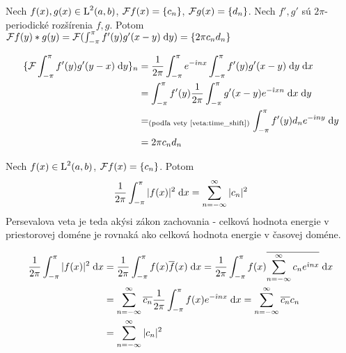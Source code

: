\begin{veta}[O konvolúcii]
Nech $f(x),g(x) \in \mbox{L}^2(a,b)$, $\mathcal{F}{f(x)} = \{c_n\}$,
$\mathcal{F}{g(x)} = \{d_n\}$. Nech $f', g'$ sú $2\pi$-periodické
rozšírenia $f,g$. Potom $\mathcal{F} f(y)*g(y) = 
    \mathcal{F} (\int_{-\pi}^{\pi} f'(y)g'(x-y) \; \mathrm{d} y) = \{ 2\pi c_n d_n \}$

\end{veta}
\begin{dokaz}
    \begin{equation*}
    \begin{split}
        \{\mathcal{F} \int_{-\pi}^{\pi} f'(y)g'(y-x) \; \mathrm{d} y\}_n 
        &= \frac{1}{2\pi} \int_{-\pi}^{\pi} e^{-\hat{\imath} n x}
            \int_{-\pi}^{\pi} f'(y)g'(x-y) \; \mathrm{d} y \; \mathrm{d} x \\
         &= \int_{-\pi}^{\pi} f'(y) \frac{1}{2\pi} \int_{-\pi}^{\pi}  g'(x-y) e^{-\hat{\imath} x n}
         \; \mathrm{d} x \; \mathrm{d} y \\
        &=_\text{(podľa vety \ref{veta:time_shift})}
          \int_{-\pi}^{\pi} f'(y) d_{n} e^{-\hat{\imath} n y} \; \mathrm{d} y \\
        &= 2\pi c_n d_n
    \end{split}
    \end{equation*}
\end{dokaz}

\begin{veta}
 Nech $f(x) \in \mbox{L}^2(a,b)$, $\mathcal{F} f(x) = \{ c_n\}$. Potom
 \begin{equation*}
   \frac{1}{2\pi} \int_{-\pi}^{\pi} |f(x)|^2 \; \mathrm{d} x = \sum_{n=-\infty}^{\infty} |c_n|^2
 \end{equation*}
 Persevalova veta je teda akýsi zákon zachovania - celková hodnota
 energie v priestorovej doméne je rovnaká ako celková hodnota energie
 v časovej doméne.
\end{veta}
\begin{dokaz}
    \begin{equation*}
    \begin{split}
        \frac{1}{2\pi} \int_{-\pi}^{\pi} |f(x)|^2 \; \mathrm{d} x 
          &= \frac{1}{2\pi} \int_{-\pi}^{\pi} f(x) \overline{f}(x) \; \mathrm{d} x 
           = \frac{1}{2\pi} \int_{-\pi}^{\pi} f(x) 
            \overline{ \sum_{n=-\infty}^{\infty} c_n e^{\hat{\imath} n x} } \; \mathrm{d} x \\
          &= \sum_{n=-\infty}^{\infty} \overline{c_n} \frac{1}{2\pi}
                \int_{-\pi}^{\pi} f(x) e^{-\hat{\imath} n x} \; \mathrm{d} x
            = \sum_{n=-\infty}^{\infty} \overline{c_n} c_n \\
          &= \sum_{n=-\infty}^{\infty} |c_n|^2
    \end{split}
    \end{equation*}
\end{dokaz}

\nocite{properties_series}
\nocite{bracewell}

